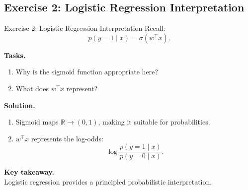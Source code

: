 \documentclass[aspectratio=169,11pt]{beamer}
\begin{document}
\subsection{Exercise 2: Logistic Regression Interpretation}
\begin{frame}[t,allowframebreaks]{Exercise 2: Logistic Regression Interpretation}
\small
Recall:
\[
p(y=1 \mid x) = \sigma(w^\top x).
\]

\textbf{Tasks.}\\ \begin{enumerate}
    \item Why is the sigmoid function appropriate here?
    \item What does $w^\top x$ represent?
\end{enumerate}

\textbf{Solution.}\\ \begin{enumerate}
\item Sigmoid maps $\mathbb{R} \to (0,1)$, making it suitable for probabilities.

\item $w^\top x$ represents the log-odds:
\[
\log \frac{p(y=1 \mid x)}{p(y=0 \mid x)}.
\]
\end{enumerate}

\textbf{Key takeaway.}\\ Logistic regression provides a principled probabilistic interpretation.
\end{frame}
\end{document}
